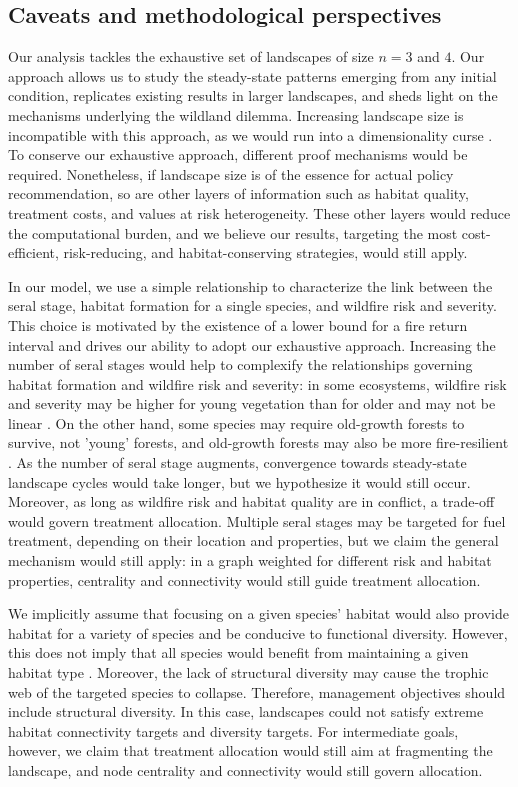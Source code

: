 \subsection{Caveats and methodological perspectives}
\label{section:caveats}
Our analysis tackles the exhaustive set of landscapes of size $n=3$ and $4$. 
Our approach allows us to study the steady-state patterns emerging from any initial condition, replicates existing results in larger landscapes, and sheds light on the mechanisms underlying the wildland dilemma. Increasing landscape size is incompatible with this approach, as we would run into a dimensionality curse \citep{Bellman}. To conserve our exhaustive approach, different proof mechanisms would be required.
Nonetheless, if landscape size is of the essence for actual policy recommendation, so are other layers of information such as habitat quality, treatment costs, and values at risk heterogeneity. These other layers would reduce the computational burden, and we believe our results, targeting the most cost-efficient, risk-reducing, and habitat-conserving strategies, would still apply. 

In our model, we use a simple relationship to characterize the link between the seral stage, habitat formation for a single species, and wildfire risk and severity. This choice is motivated by the existence of a lower bound for a fire return interval and drives our ability to adopt our exhaustive approach. Increasing the number of seral stages would help to complexify the relationships governing habitat formation and wildfire risk and severity: in some ecosystems, wildfire risk and severity may be higher for young vegetation than for older and may not be linear \citep{Taylor2014}. On the other hand, some species may require old-growth forests to survive, not 'young' forests, and old-growth forests may also be more fire-resilient \citep{lesmeister_northern_2021}.
As the number of seral stage augments, convergence towards steady-state landscape cycles would take longer, but we hypothesize it would still occur. Moreover, as long as wildfire risk and habitat quality are in conflict, a trade-off would govern treatment allocation. Multiple seral stages may be targeted for fuel treatment, depending on their location and properties, but we claim the general mechanism would still apply: in a graph weighted for different risk and habitat properties, centrality and connectivity would still guide treatment allocation. 

We implicitly assume that focusing on a given species' habitat would also provide habitat for a variety of species and be conducive to functional diversity. However, this does not imply that all species would benefit from maintaining a given habitat type \citep{saab_short-term_2022}. Moreover, the lack of structural diversity may cause the trophic web of the targeted species to collapse. Therefore, management objectives should include structural diversity. In this case, landscapes could not satisfy extreme habitat connectivity targets and diversity targets. For intermediate goals, however, we claim that treatment allocation would still aim at fragmenting the landscape, and node centrality and connectivity would still govern allocation. 

